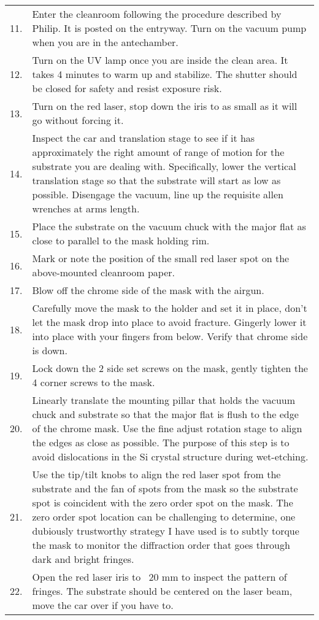 \begin{longtable}{cp{15cm}}
11.&Enter the cleanroom following the procedure described by Philip.  It is posted on the entryway.  Turn on the vacuum pump when you are in the antechamber.\\
12.&Turn on the UV lamp once you are inside the clean area.  It takes 4 minutes to warm up and stabilize.  The shutter should be closed for safety and resist exposure risk.\\
13.&Turn on the red laser, stop down the iris to as small as it will go without forcing it.\\
14.&Inspect the car and translation stage to see if it has approximately the right amount of range of motion for the substrate you are dealing with. Specifically, lower the vertical translation stage so that the substrate will start as low as possible.  Disengage the vacuum, line up the requisite allen wrenches at arms length.\\
15.&Place the substrate on the vacuum chuck with the major flat as close to parallel to the mask holding rim.\\
16.&Mark or note the position of the small red laser spot on the above-mounted cleanroom paper.\\
17.&Blow off the chrome side of the mask with the airgun.\\
18.&Carefully move the mask to the holder and set it in place, don't let the mask drop into place to avoid fracture.  Gingerly lower it into place with your fingers from below.  Verify that chrome side is down.\\
19.&Lock down the 2 side set screws on the mask, gently tighten the 4 corner screws to the mask.\\
20.&Linearly translate the mounting pillar that holds the vacuum chuck and substrate so that the major flat is flush to the edge of the chrome mask.  Use the fine adjust rotation stage to align the edges as close as possible.  The purpose of this step is to avoid dislocations in the Si crystal structure during wet-etching.\\
21.&Use the tip/tilt knobs to align the red laser spot from the substrate and the fan of spots from the mask so the substrate spot is coincident with the zero order spot on the mask.  The zero order spot location can be challenging to determine, one dubiously trustworthy strategy I have used is to subtly torque the mask to monitor the diffraction order that goes through dark and bright fringes.\\
22.&Open the red laser iris to ~20 mm to inspect the pattern of fringes.  The substrate should be centered on the laser beam, move the car over if you have to.\\

\end{longtable}
